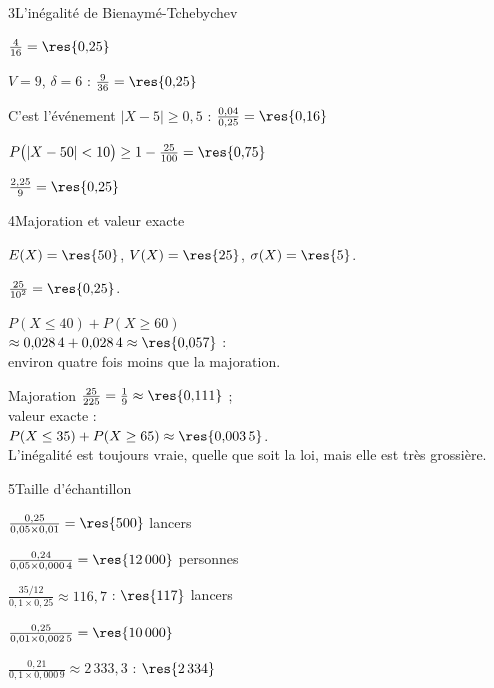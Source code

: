 \begin{deuxcolonnes}
\begin{corrige}{3}{L'inégalité de Bienaymé-Tchebychev}
\begin{questions}
  \item $\frac{4}{16}=\res{0{,}25}$
  \item $V=9$, $\delta=6$ : $\frac{9}{36}=\res{0{,}25}$
  \item C'est l'événement $|X-5|\geq0{,}5$ : $\frac{0{,}04}{0{,}25}=\res{0{,}16}$
  \item $P\big(|X-50|<10\big)\geq1-\frac{25}{100}=\res{0{,}75}$
  \item $\frac{2{,}25}{9}=\res{0{,}25}$
\end{questions}
\end{corrige}

\begin{corrige}{4}{Majoration et valeur exacte}
\begin{questions}
  \item $E(X)=\res{50}$, $V(X)=\res{25}$, $\sigma(X)=\res{5}$.
  \item $\frac{25}{10^{2}}=\res{0{,}25}$.
  \item $P(X\leq40)+P(X\geq60)$\\ $\approx0{,}028\,4+0{,}028\,4\approx\res{0{,}057}$ :\\ environ quatre fois moins que la majoration.
  \item Majoration $\frac{25}{225}=\frac19\approx\res{0{,}111}$ ;\\ valeur exacte :\\ $P(X\leq35)+P(X\geq65)\approx\res{0{,}003\,5}$.\\ L'inégalité est
    toujours vraie, quelle que soit la loi, mais elle est très grossière.
\end{questions}
\end{corrige}

\begin{corrige}{5}{Taille d'échantillon}
\begin{questions}
  \item $\frac{0{,}25}{0{,}05\times0{,}01}=\res{500}$ lancers
  \item $\frac{0{,}24}{0{,}05\times0{,}000\,4}=\res{12\,000}$ personnes
  \item $\frac{35/12}{0{,}1\times0{,}25}\approx116{,}7$ : $\res{117}$ lancers
  \item $\frac{0{,}25}{0{,}01\times0{,}002\,5}=\res{10\,000}$
  \item $\frac{0{,}21}{0{,}1\times0{,}000\,9}\approx2\,333{,}3$ : $\res{2\,334}$
\end{questions}
\end{corrige}


\end{deuxcolonnes}
